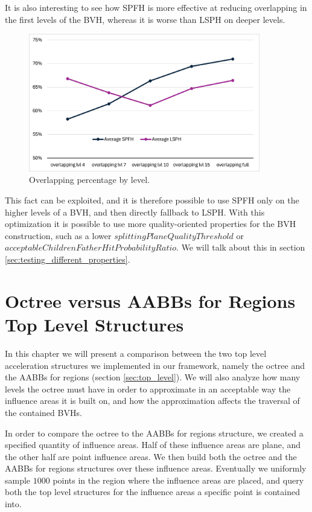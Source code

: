 \documentclass{PoliMi_MasterThesis}
\begin{document}
It is also interesting to see how SPFH is more effective at reducing overlapping in the first levels of the BVH, whereas it is worse than LSPH on deeper levels.

\begin{figure}[H]
	\centering
	\includegraphics[width=0.9\textwidth]{Images/overlapping_percentage_by_level.png}
	\caption{Overlapping percentage by level.}
	\label{fig:overlapping_percentage_by_level}
\end{figure} 

This fact can be exploited, and it is therefore possible to use SPFH only on the higher levels of a BVH, and then directly fallback to LSPH. With this optimization it is possible to use more quality-oriented properties for the BVH construction, such as a lower $splittingPlaneQualityThreshold$ or $acceptableChildrenFatherHitProbabilityRatio$. We will talk about this in section \ref{sec:testing_different_properties}.

\section{Octree versus AABBs for Regions Top Level Structures} \label{sec:octree_vs_aabbs}
In this chapter we will present a comparison between the two top level acceleration structures we implemented in our framework, namely the octree and the AABBs for regions (section \ref{sec:top_level}). We will also analyze how many levels the octree must have in order to approximate in an acceptable way the influence areas it is built on, and how the approximation affects the traversal of the contained BVHs.

In order to compare the octree to the AABBs for regions structure, we created a specified quantity of influence areas. Half of these influence areas are plane, and the other half are point influence areas. We then build both the octree and the AABBs for regions structures over these influence areas. Eventually we uniformly sample $1000$ points in the region where the influence areas are placed, and query both the top level structures for the influence areas a specific point is contained into.
\end{document}
